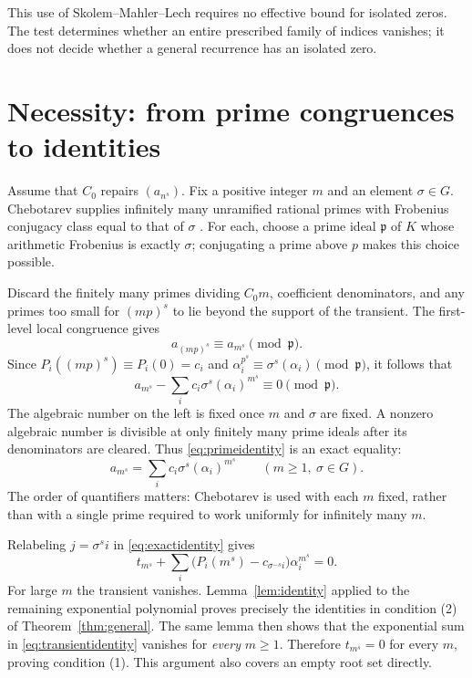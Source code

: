 \documentclass[11pt]{article}
\theoremstyle{definition}
\theoremstyle{remark}
\begin{document}
This use of Skolem--Mahler--Lech requires no effective bound for isolated zeros. The test determines whether an entire prescribed family of indices vanishes; it does not decide whether a general recurrence has an isolated zero.

\section{Necessity: from prime congruences to identities}
Assume that $C_0$ repairs $(a_{n^s})$. Fix a positive integer $m$ and an element $\sigma\in G$. Chebotarev supplies infinitely many unramified rational primes with Frobenius conjugacy class equal to that of $\sigma$ \cite[Theorem~8.31]{Milne}. For each, choose a prime ideal $\mathfrak p$ of $K$ whose arithmetic Frobenius is exactly $\sigma$; conjugating a prime above $p$ makes this choice possible.

Discard the finitely many primes dividing $C_0m$, coefficient denominators, and any primes too small for $(mp)^s$ to lie beyond the support of the transient. The first-level local congruence gives
\[
 a_{(mp)^s}\equiv a_{m^s}\pmod{\mathfrak p}.
\]
Since $P_i((mp)^s)\equiv P_i(0)=c_i$ and
$\alpha_i^{p^s}\equiv\sigma^s(\alpha_i)\pmod{\mathfrak p}$, it follows that
\begin{equation}\label{eq:primeidentity}
 a_{m^s}-\sum_i c_i\sigma^s(\alpha_i)^{m^s}
 \equiv0\pmod{\mathfrak p}.
\end{equation}
The algebraic number on the left is fixed once $m$ and $\sigma$ are fixed. A nonzero algebraic number is divisible at only finitely many prime ideals after its denominators are cleared. Thus \eqref{eq:primeidentity} is an exact equality:
\begin{equation}\label{eq:exactidentity}
 a_{m^s}=\sum_i c_i\sigma^s(\alpha_i)^{m^s}
 \qquad(m\geq1,\ \sigma\in G).
\end{equation}
The order of quantifiers matters: Chebotarev is used with each $m$ fixed, rather than with a single prime required to work uniformly for infinitely many $m$.

Relabeling $j=\sigma^s i$ in \eqref{eq:exactidentity} gives
\begin{equation}\label{eq:transientidentity}
 t_{m^s}+\sum_i\bigl(P_i(m^s)-c_{\sigma^{-s}i}\bigr)\alpha_i^{m^s}=0.
\end{equation}
For large $m$ the transient vanishes. Lemma~\ref{lem:identity} applied to the remaining exponential polynomial proves precisely the identities in condition (2) of Theorem~\ref{thm:general}. The same lemma then shows that the exponential sum in \eqref{eq:transientidentity} vanishes for \emph{every} $m\geq1$. Therefore $t_{m^s}=0$ for every $m$, proving condition (1). This argument also covers an empty root set directly.
\end{document}
